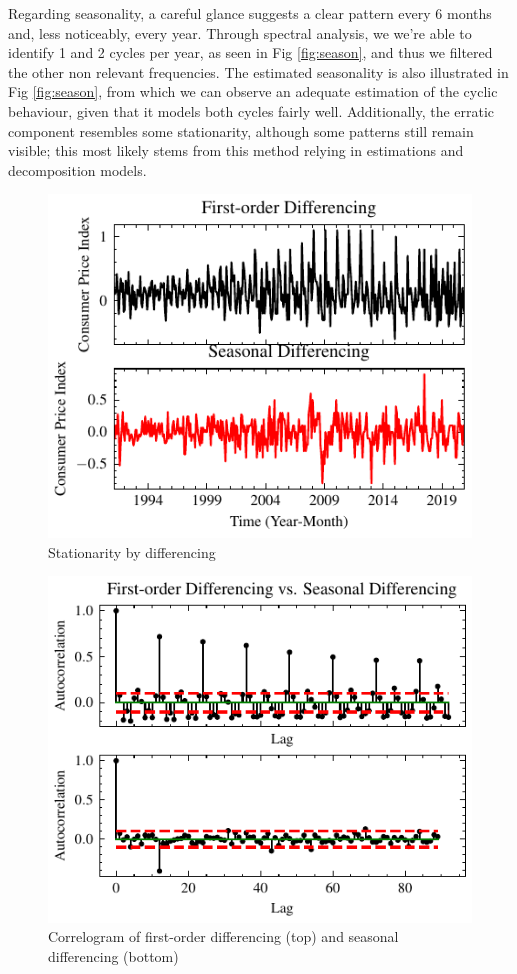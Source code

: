 \documentclass[conference]{IEEEtran}
\begin{document}
Regarding seasonality, a careful glance suggests a clear pattern every 6 months and, less noticeably, every year. Through spectral analysis, we we're able to identify 1 and 2 cycles per year, as seen in Fig \ref{fig:season}, and thus we filtered the other non relevant frequencies. The estimated seasonality is also illustrated in Fig \ref{fig:season}, from which we can observe an adequate estimation of the cyclic behaviour, given that it models both cycles fairly well. Additionally, the erratic component resembles some stationarity, although some patterns still remain visible; this most likely stems from this method relying in estimations and decomposition models.

\begin{figure}
    \centering
    \includegraphics{../figs/differencing.pdf}
    \caption{Stationarity by differencing}
    \label{fig:differencing}
\end{figure}

\begin{figure}
    \centering
    \includegraphics{../figs/acs_diff.pdf}
    \caption{Correlogram of first-order differencing (top) and seasonal differencing (bottom)}
    \label{fig:acs_diff}
\end{figure}
\end{document}
